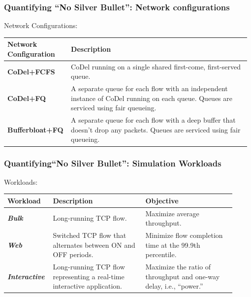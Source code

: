 \begin{frame}[plain]
\frametitle{Quantifying ``No Silver Bullet'': Network configurations}
Network Configurations:
\begin{table}
\begin{tabular}{|p{0.25\linewidth}|p{0.73\linewidth}|}
\hline
{\bf Network Configuration} & {\bf Description} \\
\hline
{\bf CoDel+FCFS} & CoDel running on a single shared first-come, first-served queue.\\
\hline
{\bf CoDel+FQ} & A separate queue for each flow with an independent instance of CoDel running on each queue. Queues are serviced using fair queueing. \\
\hline
{\bf Bufferbloat+FQ} & A separate queue for each flow with a deep buffer that doesn't drop any packets. Queues are serviced using fair queueing. \\
\hline
\end{tabular}
\end{table}
\end{frame}

\begin{frame}[plain]
\frametitle{Quantifying``No Silver Bullet'': Simulation Workloads}
Workloads:
\begin{table}
\begin{tabular}{|p{0.15\linewidth}|p{0.39\linewidth}|p{0.38\linewidth}|}
\hline
{\bf Workload} & {\bf Description} & {\bf Objective} \\
\hline
\textbf{\emph{Bulk}} & Long-running TCP flow. & Maximize average throughput. \\
\hline
\textbf{\emph{Web}} & Switched TCP flow that alternates between ON and OFF periods. & Minimize flow completion time at the 99.9th percentile. \\
\hline
\textbf{\emph{Interactive}} & Long-running TCP flow representing a real-time interactive application. & Maximize the ratio of throughput and one-way delay, i.e., ``power.'' \\
\hline
\end{tabular}
\end{table}
\end{frame}

